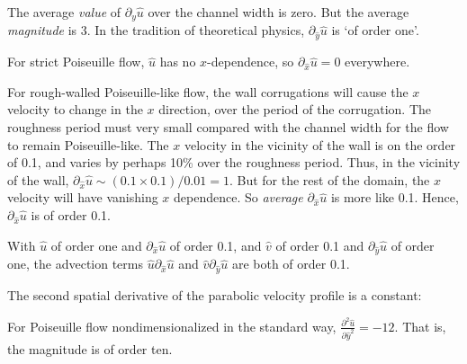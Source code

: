 \documentclass[a4paper]{report}
\begin{document}
The average \emph{value} of $\partial_y \hat{u}$ over the channel width is zero.  But the average \emph{magnitude} is 3.  In the tradition of theoretical physics, $\partial_{\hat{y}} \hat{u}$ is `of order one'.

For strict Poiseuille flow, $\hat{u}$ has no $x$-dependence, so $\partial_{\hat{x}} \hat{u} = 0$ everywhere.

For rough-walled Poiseuille-like flow, the wall corrugations will cause the $x$ velocity to change in the $x$ direction, over the period of the corrugation.  The roughness period must very small compared with the channel width for the flow to remain Poiseuille-like.  The $x$ velocity in the vicinity of the wall is on the order of 0.1, and varies by perhaps 10\% over the roughness period.  Thus, in the vicinity of the wall, $\partial_{\hat{x}} \hat{u} \sim (0.1 \times 0.1) / 0.01 = 1$.  But for the rest of the domain, the $x$ velocity will have vanishing $x$ dependence.  So \emph{average} $\partial_{\hat{x}} \hat{u}$ is more like 0.1.  Hence, $\partial_{\hat{x}} \hat{u}$ is of order 0.1.

\vspace{1em}
With $\hat{u}$ of order one and $\partial_{\hat{x}} \hat{u}$ of order 0.1, and $\hat{v}$ of order 0.1 and $\partial_{\hat{y}} \hat{u}$ of order one, the advection terms $\hat{u} \partial_{\hat{x}} \hat{u}$ and $\hat{v} \partial_{\hat{y}} \hat{u}$ are both of order 0.1.


\vspace{1em}
The second spatial derivative of the parabolic velocity profile is a constant:
\begin{center}
\end{center}

For Poiseuille flow nondimensionalized in the standard way, $ \frac{\partial^2 \hat{u}}{\partial \hat{y}^2} = -12$.  That is, the magnitude is of order ten.
\end{document}
